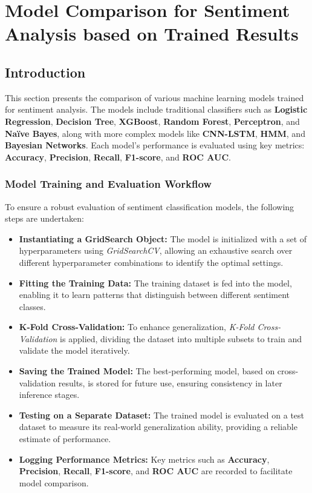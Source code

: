 \section{Model Comparison for Sentiment Analysis based on Trained Results}

\subsection{Introduction}

This section presents the comparison of various machine learning models trained for sentiment analysis. The models include traditional classifiers such as \textbf{Logistic Regression}, \textbf{Decision Tree}, \textbf{XGBoost}, \textbf{Random Forest}, \textbf{Perceptron}, and \textbf{Naïve Bayes}, along with more complex models like \textbf{CNN-LSTM}, \textbf{HMM}, and \textbf{Bayesian Networks}. Each model's performance is evaluated using key metrics: \textbf{Accuracy}, \textbf{Precision}, \textbf{Recall}, \textbf{F1-score}, and \textbf{ROC AUC}.

\subsubsection{Model Training and Evaluation Workflow}

To ensure a robust evaluation of sentiment classification models, the following steps are undertaken:

\begin{itemize}
    \item \textbf{Instantiating a GridSearch Object:} The model is initialized with a set of hyperparameters using \textit{GridSearchCV}, allowing an exhaustive search over different hyperparameter combinations to identify the optimal settings.
    
    \item \textbf{Fitting the Training Data:} The training dataset is fed into the model, enabling it to learn patterns that distinguish between different sentiment classes.
    
    \item \textbf{K-Fold Cross-Validation:} To enhance generalization, \textit{K-Fold Cross-Validation} is applied, dividing the dataset into multiple subsets to train and validate the model iteratively.
    
    \item \textbf{Saving the Trained Model:} The best-performing model, based on cross-validation results, is stored for future use, ensuring consistency in later inference stages.
    
    \item \textbf{Testing on a Separate Dataset:} The trained model is evaluated on a test dataset to measure its real-world generalization ability, providing a reliable estimate of performance.
    
    \item \textbf{Logging Performance Metrics:} Key metrics such as \textbf{Accuracy}, \textbf{Precision}, \textbf{Recall}, \textbf{F1-score}, and \textbf{ROC AUC} are recorded to facilitate model comparison.
\end{itemize}

